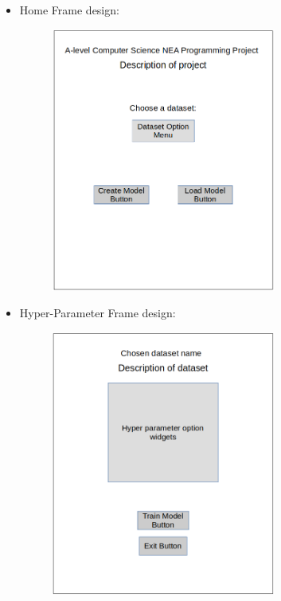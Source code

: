 \documentclass[./project-report/src/latex/project-report.tex]{subfiles}
\begin{document}
\begin{itemize}
    \item Home Frame design:
        \begin{figure}[h!]
        \centering
        \includegraphics[width=0.7\textwidth]{./project-report/src/images/home-frame-design.png}
        \end{figure}

    \pagebreak

    \item Hyper-Parameter Frame design:
        \begin{figure}[h!]
        \centering
        \includegraphics[width=0.7\textwidth]{./project-report/src/images/hyper-parameter-frame-design.png}
        \end{figure}


\end{itemize}
\end{document}
